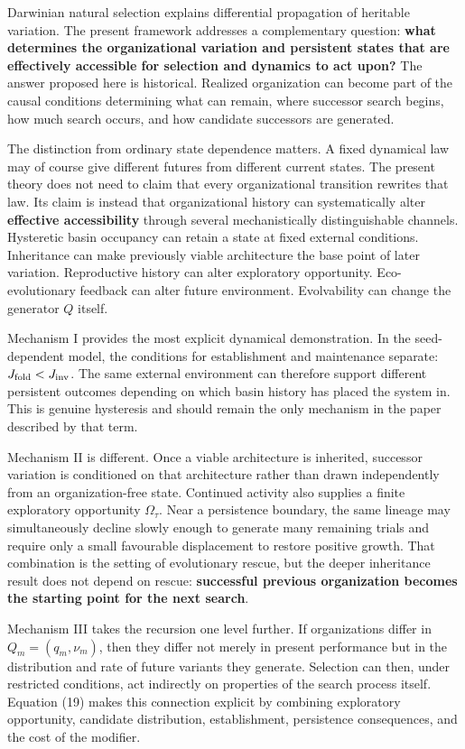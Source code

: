 \documentclass[11pt,a4paper]{article}
\begin{document}
Darwinian natural selection explains differential propagation of
heritable variation. The present framework addresses a complementary
question: \textbf{what determines the organizational variation and
persistent states that are effectively accessible for selection and
dynamics to act upon?} The answer proposed here is historical. Realized
organization can become part of the causal conditions determining what
can remain, where successor search begins, how much search occurs, and
how candidate successors are generated.

The distinction from ordinary state dependence matters. A fixed
dynamical law may of course give different futures from different
current states. The present theory does not need to claim that every
organizational transition rewrites that law. Its claim is instead that
organizational history can systematically alter \textbf{effective
accessibility} through several mechanistically distinguishable channels.
Hysteretic basin occupancy can retain a state at fixed external
conditions. Inheritance can make previously viable architecture the base
point of later variation. Reproductive history can alter exploratory
opportunity. Eco-evolutionary feedback can alter future environment.
Evolvability can change the generator \(Q\) itself.

Mechanism I provides the most explicit dynamical demonstration. In the
seed-dependent model, the conditions for establishment and maintenance
separate: \(J_{\rm fold}<J_{\rm inv}\). The same external environment
can therefore support different persistent outcomes depending on which
basin history has placed the system in. This is genuine hysteresis and
should remain the only mechanism in the paper described by that term.

Mechanism II is different. Once a viable architecture is inherited,
successor variation is conditioned on that architecture rather than
drawn independently from an organization-free state. Continued activity
also supplies a finite exploratory opportunity \(\Omega_\tau\). Near a
persistence boundary, the same lineage may simultaneously decline slowly
enough to generate many remaining trials and require only a small
favourable displacement to restore positive growth. That combination is
the setting of evolutionary rescue, but the deeper inheritance result
does not depend on rescue: \textbf{successful previous organization
becomes the starting point for the next search}.

Mechanism III takes the recursion one level further. If organizations
differ in \(Q_m=(q_m,\nu_m)\), then they differ not merely in present
performance but in the distribution and rate of future variants they
generate. Selection can then, under restricted conditions, act
indirectly on properties of the search process itself. Equation (19)
makes this connection explicit by combining exploratory opportunity,
candidate distribution, establishment, persistence consequences, and the
cost of the modifier.
\end{document}

